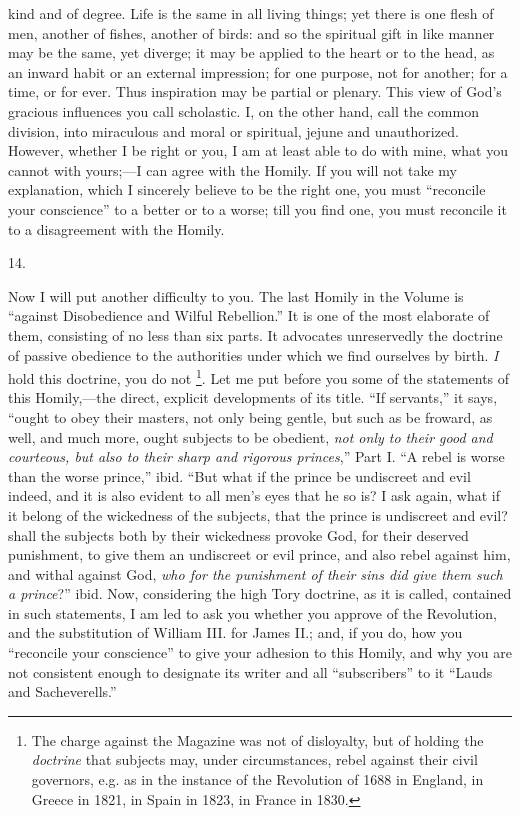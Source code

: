 kind and of degree. Life is the same in all living things; yet there
is one flesh of men, another of fishes, another of birds: and so the
spiritual gift in like manner may be the same, yet diverge; it may be
applied to the heart or to the head, as an inward habit or an external
impression; for one purpose, not for another; for a time, or for ever.
Thus inspiration may be partial or plenary. This view of God's
gracious influences you call scholastic. I, on the other hand, call
the common division, into miraculous and moral or spiritual, jejune
and unauthorized. However, whether I be right or you, I am at least
able to do with mine, what you cannot with yours;—I can agree with
the Homily. If you will not take my explanation, which I sincerely
believe to be the right one, you must ``reconcile your conscience'' to a
better or to a worse; till you find one, you must reconcile it to a
disagreement with the Homily.

14.

Now I will put another difficulty to you. The
last Homily in the Volume is ``against Disobedience and Wilful
Rebellion.'' It is one of the most elaborate of them, consisting of no
less than six parts. It advocates unreservedly the doctrine of passive
obedience to the authorities under which we find ourselves by birth. \emph{I}
hold this doctrine, you do not \footnote{The charge against the Magazine was not of disloyalty, but of holding
the \emph{doctrine} that subjects may, under circumstances, rebel
against their civil governors, e.g. as in the instance of the
Revolution of 1688 in England, in Greece in 1821, in Spain in 1823, in
France in 1830.}.
Let me put before you some of the statements of this Homily,—the
direct, explicit developments of its title. ``If servants,'' it says, ``ought
to obey their masters, not only being gentle, but such as be froward,
as well, and much more, ought subjects to be obedient, \emph{not only to
their good and courteous, but also to their sharp and rigorous princes},''
Part I. ``A rebel is worse than the worse prince,'' ibid. ``But what if
the prince be undiscreet and evil indeed, and it is also evident to
all men's eyes that he so is? I ask again, what if it belong of the
wickedness of the subjects, that the prince is undiscreet and evil?
shall the subjects both by their wickedness provoke God, for their
deserved punishment, to give them an undiscreet or evil prince, and
also rebel against him, and withal against God, \emph{who for the
punishment of their sins did give them such a prince}?'' ibid. Now,
considering the high Tory doctrine, as it is called, contained in such
statements, I am led to ask you whether you approve of the Revolution,
and the substitution of William III. for James II.; and, if you do,
how you ``reconcile your conscience'' to give your adhesion to this
Homily, and why you are not consistent enough to designate its writer
and all ``subscribers'' to it ``Lauds and Sacheverells.''


